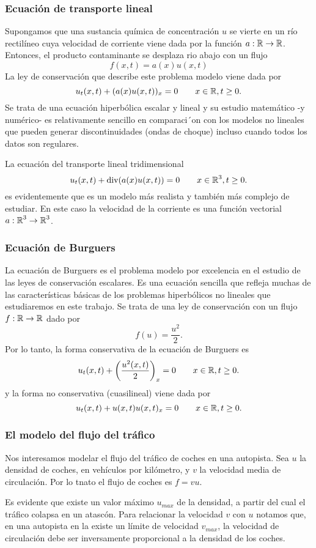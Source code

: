 \subsubsection{Ecuación de transporte lineal}
Supongamos que una sustancia química de concentración $u$ se vierte en un río rectilíneo cuya velocidad de corriente viene dada por la función $a: \operatorname{\mathbb R} \rightarrow \operatorname{\mathbb R}$. Entonces, el producto contaminante se desplaza rio abajo con un flujo
\[
f(x,t) = a(x)u(x,t)
\]
La ley de conservación que describe este problema modelo viene dada por
\[
u_t(x,t) + (a(x)u(x,t))_x = 0  \qquad x \in \operatorname{\mathbb R}, t\geq0.
\]
Se trata de una ecuación hiperbólica escalar y lineal y su estudio matemático -y numérico- es relativamente sencillo en comparaci´on con los modelos no lineales que pueden generar discontinuidades (ondas de choque) incluso cuando todos los datos son regulares.

La ecuación del transporte lineal tridimensional
\[
u_t(x,t) + \text{div}(a(x)u(x,t)) = 0 \qquad x \in \operatorname{\mathbb R}^3, t\geq0.
\]
es evidentemente que es un modelo más realista y también más complejo de estudiar. En este caso la velocidad de la corriente es una función vectorial $a : \operatorname{\mathbb R}^3 \rightarrow \operatorname{\mathbb R}^3$.

\subsubsection{Ecuación de Burguers}
La ecuación de Burguers es el problema modelo por excelencia en el estudio de las leyes de conservación escalares. Es una ecuación sencilla que refleja muchas de las características básicas de los problemas hiperbólicos no lineales que estudiaremos en este trabajo. Se trata de una ley de conservación con un flujo  $f : \operatorname{\mathbb R} \rightarrow \operatorname{\mathbb R}$ dado por
\[
f(u) = \frac{u^2}{2}.
\]
Por lo tanto, la forma conservativa de la ecuación de Burguers es
\[
u_t(x,t) + \left( \frac{u^2 (x,t)}{2} \right)_x = 0 \qquad x \in \operatorname{\mathbb R}, t\geq0.
\]
y la forma no conservativa (cuasilineal) viene dada por
\[
u_t(x,t) + u(x,t) u(x,t)_x = 0 \qquad x \in \operatorname{\mathbb R}, t\geq0.
\]


\subsubsection{El modelo del flujo del tráfico}
Nos interesamos modelar el flujo del tráfico de coches en una autopista. Sea $u$ la densidad de coches, en vehículos por kilómetro, y $v$ la velocidad media de circulación. Por lo tnato el flujo de coches es $f=v u$.

Es evidente que existe un valor máximo $u_{max}$ de la densidad, a partir del cual el tráfico colapsa en un atascón. Para relacionar la velocidad $v$ con $u$ notamos que, en una autopista en la existe un límite de velocidad $v_{max}$, la velocidad de circulación debe ser inversamente proporcional a la densidad de los coches.

